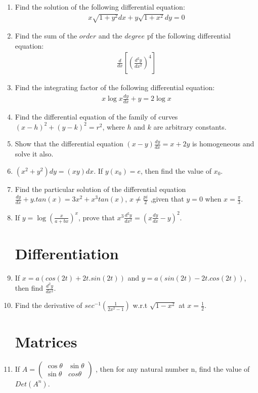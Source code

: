 \documentclass[12pt,-letter paper]{article}
\newcommand{\myvec}[1]{\ensuremath{\begin{pmatrix}#1\end{pmatrix}}}
\providecommand{\brak}[1]{\ensuremath{\left(#1\right)}}
\providecommand{\sbrak}[1]{\ensuremath{{}\left[#1\right]}}
\providecommand{\brak}[1]{\ensuremath{\left(#1\right)}}
\begin{document}
\begin{enumerate}
	\item Find the solution of the following differential equation:
    \begin{align*}
        x \sqrt{1+y^2} dx +  y \sqrt{1+x^2} dy = 0 
    \end{align*}

	\item Find the sum of the $order$ and the $degree$ pf the following differential equation:
    \begin{align*}
         \frac{d}{dx}\sbrak{\brak{\frac{d^2y}{dx^2}}^4}
    \end{align*}

	\item Find the integrating factor of the following differential equation:
    \begin{align*}
        x \log{x} \frac{dy}{dx} +  y  = 2 \log{x} 
    \end{align*}

	\item Find the differential equation of the family of curves $\brak{x-h}^2+\brak{y-k}^2 = r^2$, where $h$ and $k$ are arbitrary constants.
    \item Show that the differential equation $\brak{x-y}\frac{dy}{dx} = x+2y$ is homogeneous and solve it also.
	\item $\brak{x^2+y^2}dy = \brak{xy}dx$. If $y(x_0) = e$, then find the value of $x_0$.
    \item Find the particular solution of the differential equation $\frac{dy}{dx}+y.tan(x)=3x^2+x^3tan(x)$, $x\neq \frac{pi}{2}$ ,given that $y=0$ when $x = \frac{\pi}{3}$.
	\item If $y = \log{\brak{\frac{x}{a+bx}}^x}$, prove that $x^3\frac{d^2y}{dx^2} = \brak{x\frac{dy}{dx}-y}^2$.
	

\section{Differentiation}
    \item If $x=a(cos(2t)+2t .sin(2t))$ and $y=a(sin(2t)-2t .cos(2t))$, then find $\frac{d^2y}{dx^2}$.
    \item Find the derivative of $sec^{-1}\brak{\frac{1}{2x^2-1}}$ w.r.t $\sqrt{1-x^2}$ at $x = \frac{1}{2}$.
\section{Matrices}
	\item If $A = \myvec{\cos{\theta}&\sin{\theta}\\\sin{\theta}&cos{\theta}}$ , then for any natural number n, find the value of $Det(A^n)$.


\end{enumerate}
\end{document}
